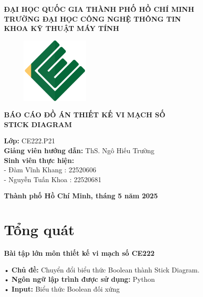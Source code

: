 \documentclass[a4paper,12pt]{article}
\begin{document}
\thispagestyle{empty}
\begin{center}
\textbf{\Large ĐẠI HỌC QUỐC GIA THÀNH PHỐ HỒ CHÍ MINH}\\
\textbf{\Large TRƯỜNG ĐẠI HỌC CÔNG NGHỆ THÔNG TIN}\\
\textbf{\Large KHOA KỸ THUẬT MÁY TÍNH}\\[1cm]

\begin{figure}[H]
    \centering
    \includegraphics[width=0.3\textwidth]{../PNG/CE.png}
    \label{fig:LOGO_CE}\\
\end{figure}

\vspace {1cm}

\textbf{\Large BÁO CÁO ĐỒ ÁN THIẾT KẾ VI MẠCH SỐ}\\[0.5cm]
\textbf{\Large STICK DIAGRAM}\\[5cm]

\begin{flushleft}

\textbf{Lớp:} CE222.P21\\
\textbf{Giảng viên hướng dẫn:} ThS. Ngô Hiếu Trường\\
\textbf{Sinh viên thực hiện:} \\
- Đàm Vĩnh Khang : 22520606 \\
- Nguyễn Tuấn Khoa : 22520681\\[3.5cm]

\end{flushleft}
\end{center}
\begin{center}
\textbf{Thành phố Hồ Chí Minh, tháng 5 năm 2025}
\end{center}
\newpage
\setcounter{page}{1}
\tableofcontents
\newpage


\section{Tổng quát}
\begin{center}
\textbf{\large Bài tập lớn môn thiết kế vi mạch số CE222}
\end{center}
• \textbf{Chủ đề:} Chuyển đổi biểu thức Boolean thành Stick Diagram.\\
• \textbf{Ngôn ngữ lập trình được sử dụng:} Python\\
• \textbf{Input:} Biểu thức Boolean đối xứng
\end{document}
